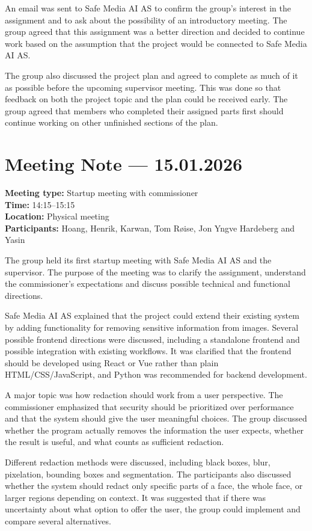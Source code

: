 An email was sent to Safe Media AI AS to confirm the group's interest in the assignment and to ask about the possibility of an introductory meeting. The group agreed that this assignment was a better direction and decided to continue work based on the assumption that the project would be connected to Safe Media AI AS.

The group also discussed the project plan and agreed to complete as much of it as possible before the upcoming supervisor meeting. This was done so that feedback on both the project topic and the plan could be received early. The group agreed that members who completed their assigned parts first should continue working on other unfinished sections of the plan.

\section{Meeting Note --- 15.01.2026}
\label{app:meeting-2026-01-15}
\textbf{Meeting type:} Startup meeting with commissioner\\
\textbf{Time:} 14:15--15:15\\
\textbf{Location:} Physical meeting\\
\textbf{Participants:} Hoang, Henrik, Karwan, Tom Røise, Jon Yngve Hardeberg and Yasin

The group held its first startup meeting with Safe Media AI AS and the supervisor. The purpose of the meeting was to clarify the assignment, understand the commissioner's expectations and discuss possible technical and functional directions.

Safe Media AI AS explained that the project could extend their existing system by adding functionality for removing sensitive information from images. Several possible frontend directions were discussed, including a standalone frontend and possible integration with existing workflows. It was clarified that the frontend should be developed using React or Vue rather than plain HTML/CSS/JavaScript, and Python was recommended for backend development.

A major topic was how redaction should work from a user perspective. The commissioner emphasized that security should be prioritized over performance and that the system should give the user meaningful choices. The group discussed whether the program actually removes the information the user expects, whether the result is useful, and what counts as sufficient redaction.

Different redaction methods were discussed, including black boxes, blur, pixelation, bounding boxes and segmentation. The participants also discussed whether the system should redact only specific parts of a face, the whole face, or larger regions depending on context. It was suggested that if there was uncertainty about what option to offer the user, the group could implement and compare several alternatives.

